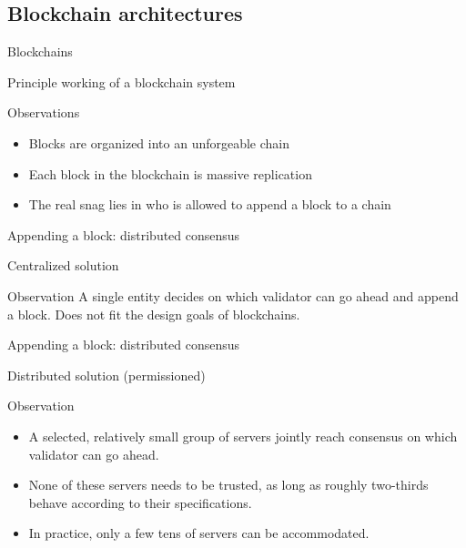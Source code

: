 \subsection{Blockchain architectures}
\begin{slide}{Blockchains}
  \begin{block}{Principle working of a blockchain system}
    \centering{}
  \end{block}
  \onslide
  \begin{block}{Observations}
    \begin{itemize}\firmlist
    \item Blocks are organized into an unforgeable  chain
    \item Each block in the blockchain is  \mathexpr{\Rightarrow} massive replication
    \item The real snag lies in who is allowed to append a block to a chain
    \end{itemize}
    
  \end{block}
\end{slide}
\begin{slide}{Appending a block: distributed consensus}
  \begin{block}{Centralized solution}
    \begin{centerfig}
    \end{centerfig}
  \end{block}
  \begin{block}{Observation}
    A single entity decides on which validator can go ahead and append a block. Does not fit the design goals
    of blockchains.
  \end{block}
\end{slide}
\begin{slide}{Appending a block: distributed consensus}
  \begin{block}{Distributed solution (permissioned)}
    \begin{centerfig}
    \end{centerfig}
  \end{block}
  \begin{block}{Observation}
    \begin{itemize}\firmlist
    \item A selected, relatively small group of servers jointly reach consensus on which validator can go
      ahead.
    \item None of these servers needs to be trusted, as long as roughly two-thirds behave according to their
      specifications.
    \item In practice, only a few tens of servers can be accommodated.
    \end{itemize}
  \end{block}
\end{slide}
